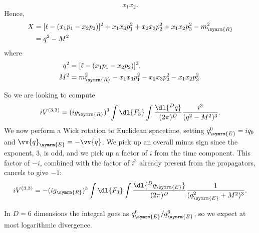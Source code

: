 \documentclass[fleqn]{NotesClass}
\newcommand{\renormalised}{\symrm{R}}
\begin{document}
    \begin{equation}
        x_1 x_2.
    \end{equation}
    Hence,
    \begin{align}
        X &= [\ell - (x_1p_1 - x_2p_2)]^2 + x_1x_3 p_1^2 + x_2x_3 p_2^2 + x_1x_2 p_3^2 - m_{\renormalised}^2\\
        &= q^2 - M^2
    \end{align}
    where
    \begin{align}
        q^2 &= [\ell - (x_1 p_1 - x_2p_2)]^2,\\
        M^2 &= m_{\renormalised}^2 - x_1x_3 p_1^2 - x_2x_3 p_2^2 - x_1x_2 p_3^2.
    \end{align}
    
    So we are looking to compute
    \begin{equation}
        iV^{(3, 3)} = (ig_{\renormalised})^3 \int \dl{F_3} \int \frac{\dl{^Dq}}{(2\pi)^D} \frac{i^3}{(q^2 - M^2)^3}.
    \end{equation}
    We now perform a Wick rotation to Euclidean spacetime, setting \(q_{\symrm{E}}^0 = iq_0\) and \(\vv{q}_{\symrm{E}} = -\vv{q}\).
    We pick up an overall minus sign since the exponent, 3, is odd, and we pick up a factor of \(i\) from the time component.
    This factor of \(-i\), combined with the factor of \(i^3\) already present from the propagators, cancels to give \(-1\):
    \begin{equation}
        iV^{(3, 3)} = - (ig_{\renormalised})^3 \int \dl{F_3} \int \frac{\dl{^Dq_{\symrm{E}}}}{(2\pi)^D} \frac{1}{(q_{\symrm{E}}^2 + M^2)^3}.
    \end{equation}
    
    In \(D = 6\) dimensions the integral goes as \(q_{\symrm{E}}^6/q_{\symrm{E}}^6\), so we expect at most logarithmic divergence.
    
\end{document}
